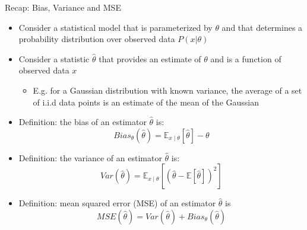 \documentclass[aspectratio=169]{../latex_main/tntbeamer}  %
\begin{document}
\begin{frame}[c]{Recap: Bias, Variance and MSE}

\begin{itemize}
	\item Consider a statistical model that is parameterized by $\theta$ and that determines
	a probability distribution over observed data $P(x|\theta)$
	\item Consider a statistic $\hat{\theta}$ that provides an estimate of $\theta$ and is a function of
	observed data $x$
	\begin{itemize}
		\item E.g. for a Gaussian distribution with known variance, the average of a set of
		i.i.d data points is an estimate of the mean of the Gaussian
	\end{itemize}
	\item Definition: the bias of an estimator $\hat{\theta}$ is:
	$$ Bias_{\theta} (\hat{\theta}) = \mathbb{E}_{x\mid \theta} [\hat{\theta}] - \theta$$
	\item Definition: the variance of an estimator $\hat{\theta}$ is:
	$$ Var (\hat{\theta}) = \mathbb{E}_{x\mid \theta} [(\hat{\theta} - \mathbb{E}[\hat{\theta}])^2] $$
	\item Definition: mean squared error (MSE) of an estimator $\hat{\theta}$ is
	$$MSE(\hat{\theta}) = Var(\hat{\theta})  + Bias_{\theta} (\hat{\theta}) $$
\end{itemize}

\end{frame}
\end{document}
